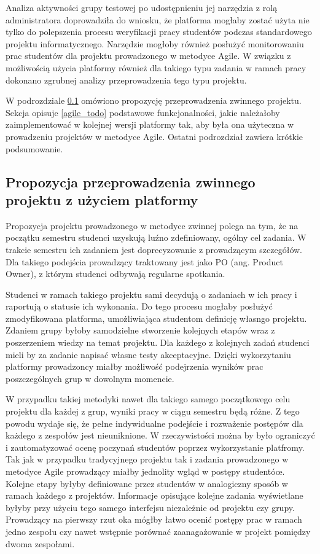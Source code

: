 Analiza aktywności grupy testowej po udostępnieniu jej narzędzia z rolą administratora doprowadziła do wniosku, że platforma mogłaby zostać użyta nie tylko do polepszenia procesu weryfikacji pracy studentów podczas standardowego projektu informatycznego.
Narzędzie mogłoby również posłużyć monitorowaniu prac studentów dla projektu prowadzonego w metodyce Agile.
W związku z możliwością użycia platformy również dla takiego typu zadania w ramach pracy dokonano zgrubnej analizy przeprowadzenia tego typu projektu.

W podrozdziale \ref{agile_proposition} omówiono propozycję przeprowadzenia zwinnego projektu.
Sekcja opisuje \ref{agile_todo} podstawowe funkcjonalności, jakie należałoby zaimplementować w kolejnej wersji platformy tak, aby była ona użyteczna w prowadzeniu projektów w metodyce Agile.
Ostatni podrozdział zawiera krótkie podsumowanie.

\subsection{Propozycja przeprowadzenia zwinnego projektu z użyciem platformy}
\label{agile_proposition}

Propozycja projektu prowadzonego w metodyce zwinnej polega na tym, że na początku semestru studenci uzyskują luźno zdefiniowany, ogólny cel zadania.
W trakcie semestru ich zadaniem jest doprecyzowanie z prowadzącym szczegółów.
Dla takiego podejścia prowadzący traktowany jest jako PO (ang. Product Owner), z którym studenci odbywają regularne spotkania.

Studenci w ramach takiego projektu sami decydują o zadaniach w ich pracy i raportują o statusie ich wykonania.
Do tego procesu mogłaby posłużyć zmodyfikowana platforma, umożliwiająca studentom definicję własngo projektu.
Zdaniem grupy byłoby samodzielne stworzenie kolejnych etapów wraz z poszerzeniem wiedzy na temat projektu.
Dla każdego z kolejnych zadań studenci mieli by za zadanie napisać własne testy akceptacyjne.
Dzięki wykorzytaniu platformy prowadzoncy miałby możliwość podejrzenia wyników prac poszczególnych grup w dowolnym momencie.

W przypadku takiej metodyki nawet dla takiego samego początkowego celu projektu dla każdej z grup, wyniki pracy w ciągu semestru będą różne.
Z tego powodu wydaje się, że pełne indywidualne podejście i rozważenie postępów dla każdego z zespołów jest nieuniknione.
W rzeczywistości można by było ograniczyć i zautomatyzować ocenę poczynań studentów poprzez wykorzystanie platfromy.
Tak jak w przypadku tradycyjnego projektu tak i zadania prowadzonego w metodyce Agile prowadzący miałby jednolity wgląd w postępy studentóœ.
Kolejne etapy byłyby definiowane przez studentów w analogiczny sposób w ramach każdego z projektów.
Informacje opisujące kolejne zadania wyświetlane byłyby przy użyciu tego samego interfejsu niezależnie od projektu czy grupy.
Prowadzący na pierwszy rzut oka mógłby łatwo ocenić postępy prac w ramach jedno zespołu czy nawet wstępnie porównać zaanagażowanie w projekt pomiędzy dwoma zespołami.

